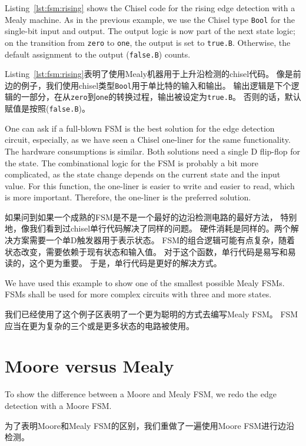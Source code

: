 \documentclass[%
    10pt,
    headinclude, footexclude,
    openright, %
    notitlepage,
    cleardoubleempty,
    headsepline,
    pointlessnumbers,
    bibtotoc, idxtotoc,
    ]{scrbook}
\newcommand{\code}[1]{{\small{\texttt{#1}}}}
\begin{document}

Listing~\ref{lst:fsm:rising} shows the Chisel code for the rising edge detection
with a Mealy machine.
As in the previous example, we use the Chisel type \code{Bool} for the
single-bit input and output.
The output logic is now part of the next state logic; on the transition from
\code{zero} to \code{one}, the output is set to \code{true.B}. Otherwise,
the default assignment to the output (\code{false.B}) counts.

Listing~\ref{lst:fsm:rising}表明了使用Mealy机器用于上升沿检测的chisel代码。
像是前边的例子，我们使用chisel类型\code{Bool}用于单比特的输入和输出。
输出逻辑是下个逻辑的一部分，在从\code{zero}到\code{one}的转换过程，输出被设定为\code{true.B}。
否则的话，默认赋值是按照(\code{false.B})。

One can ask if a full-blown FSM is the best solution for the edge detection circuit,
especially, as we have seen a Chisel one-liner for the same functionality.
The hardware consumptions is similar. Both solutions need a single D flip-flop
for the state. The combinational logic for the FSM is probably a bit more complicated, as
the state change depends on the current state and the input value.
For this function, the one-liner is easier to write and easier to read,
which is more important. Therefore, the one-liner is the preferred solution.

如果问到如果一个成熟的FSM是不是一个最好的边沿检测电路的最好方法，
特别地，像我们看到过chisel单行代码解决了同样的问题。
硬件消耗是同样的。两个解决方案需要一个单D触发器用于表示状态。
FSM的组合逻辑可能有点复杂，随着状态改变，需要依赖于现有状态和输入值。
对于这个函数，单行代码是易写和易读的，这个更为重要。
于是，单行代码是更好的解决方式。

We have used this example to show one of the smallest possible Mealy FSMs.
FSMs shall be used for more complex circuits with three and more states.

我们已经使用了这个例子区表明了一个更为聪明的方式去编写Mealy FSM。
FSM应当在更为复杂的三个或是更多状态的电路被使用。

\section{Moore versus Mealy}

To show the difference between a Moore and Mealy FSM, we redo the edge
detection with a Moore FSM. 

为了表明Moore和Mealy FSM的区别，我们重做了一遍使用Moore FSM进行边沿检测。
\end{document}
